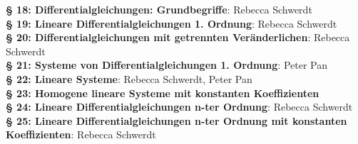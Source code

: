 \documentclass[a4paper,twoside,DIV15,BCOR12mm,chapterprefix=true,headings=twolinechapter]{scrbook}
\begin{document}
\textbf{§ 18: Differentialgleichungen: Grundbegriffe}: Rebecca Schwerdt\\
\textbf{§ 19: Lineare Differentialgleichungen 1. Ordnung}: Rebecca Schwerdt\\
\textbf{§ 20: Differentialgleichungen mit getrennten Veränderlichen}: Rebecca Schwerdt\\
\textbf{§ 21: Systeme von Differentialgleichungen 1. Ordnung}: Peter Pan\\
\textbf{§ 22: Lineare Systeme}: Rebecca Schwerdt, Peter Pan\\
\textbf{§ 23: Homogene lineare Systeme mit konstanten Koeffizienten}\\
\textbf{§ 24: Lineare Differentialgleichungen n-ter Ordnung}: Rebecca Schwerdt\\
\textbf{§ 25: Lineare Differentialgleichungen n-ter Ordnung mit konstanten Koeffizienten}: Rebecca Schwerdt\\
\end{document}

